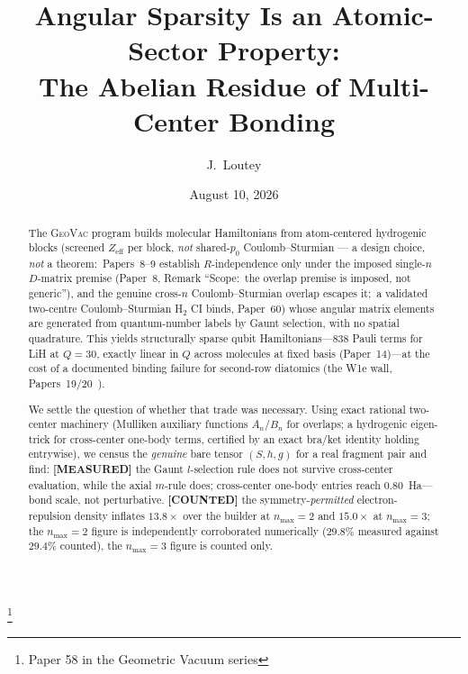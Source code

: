\documentclass[aps,pra,twocolumn,superscriptaddress,longbibliography]{revtex4-2}
\begin{document}
\title{Angular Sparsity Is an Atomic-Sector Property:\\
The Abelian Residue of Multi-Center Bonding}
\thanks{Paper 58 in the Geometric Vacuum series}

\author{J.~Loutey}

\date{August 10, 2026}


\begin{abstract}
The \textsc{GeoVac} program builds molecular Hamiltonians from
atom-centered hydrogenic blocks (screened $Z_{\mathrm{eff}}$ per block,
\emph{not} shared-$p_{0}$ Coulomb--Sturmian --- a design choice, \emph{not} a
theorem:\ Papers~8--9 establish $R$-independence only under the imposed
single-$n$ $D$-matrix premise (Paper~8, Remark ``Scope:\ the overlap premise is
imposed, not generic''), and the
genuine cross-$n$ Coulomb--Sturmian overlap escapes it;\ a validated
two-centre Coulomb--Sturmian H$_2$ CI binds, Paper~60) whose angular
matrix elements are
generated from quantum-number labels by Gaunt selection, with no spatial
quadrature.  This yields structurally sparse qubit Hamiltonians---838
Pauli terms for LiH at $Q = 30$, exactly linear in $Q$ across
molecules at fixed basis (Paper~14)---at
the cost of a documented binding failure for second-row diatomics
(the W1e wall, Papers~19/20~\cite{loutey_paper19,loutey_paper20}).

We settle the question of whether that trade was necessary.  Using exact
rational two-center machinery (Mulliken auxiliary functions $A_n$/$B_n$
for overlaps; a hydrogenic eigen-trick for cross-center one-body terms,
certified by an exact bra/ket identity holding entrywise), we census the
\emph{genuine} bare tensor $(S, h, g)$ for a real fragment pair and find:
\textbf{[MEASURED]} the Gaunt $l$-selection rule does not survive
cross-center evaluation, while the axial $m$-rule does; cross-center
one-body entries reach $0.80$~Ha---bond scale, not perturbative.
\textbf{[COUNTED]} the symmetry-\emph{permitted} electron-repulsion density
inflates $13.8\times$ over the builder at $n_{\max} = 2$ and $15.0\times$
at $n_{\max} = 3$; the $n_{\max} = 2$ figure is independently corroborated
numerically ($29.8\%$ measured against $29.4\%$ counted), the
$n_{\max} = 3$ figure is counted only.


\end{abstract}
\end{document}
